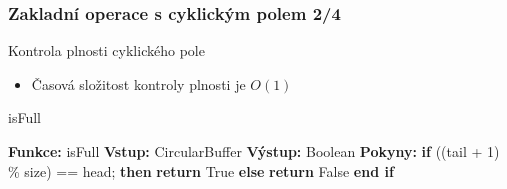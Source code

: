 \documentclass[]{fitthesispresn}
\begin{document}
    \begin{frame}
        \frametitle{Zakladní operace s cyklickým polem 2/4}
        Kontrola plnosti cyklického pole
        \begin{itemize}
            \item Časová složitost kontroly plnosti je $O(1)$
        \end{itemize}
        \begin{algorithm}[H]
            \caption{isFull}
            \label{alg:isfull}
            \begin{algorithmic}[1]
                \State \textbf{Funkce:} isFull
                \State \textbf{Vstup:} CircularBuffer
                \State \textbf{Výstup:} Boolean
                \State \textbf{Pokyny:}
                \State \hspace{\algorithmicindent} \textbf{if} ((tail + 1) \% size) == head; \textbf{then}
                \State \hspace{\algorithmicindent} \hspace{\algorithmicindent} \textbf{return} True
                \State \hspace{\algorithmicindent} \textbf{else}
                \State \hspace{\algorithmicindent} \hspace{\algorithmicindent} \textbf{return} False
                \State \hspace{\algorithmicindent} \textbf{end if}
            \end{algorithmic}
        \end{algorithm}
    \end{frame}
\end{document}
